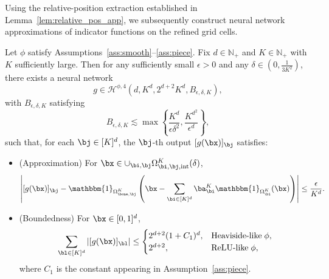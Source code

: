 \documentclass[11pt]{article}
\begin{document}
Using the relative-position extraction established in Lemma~\ref{lem:relative_pos_app},  we subsequently construct neural network approximations of indicator functions on the refined grid cells.
\begin{lemma}
    Let $\phi$ satisfy Assumptions~\ref{ass:smooth}--\ref{ass:piece}. Fix $d\in\mathbb{N}_{+}$ and $K\in\mathbb{N}_{+}$ with $K$ sufficiently large.
    Then for any sufficiently small $\epsilon>0$ and any $\delta \in (0, \frac{1}{3K^2})$, there exists a neural network   
    \begin{equation*}
        g \in \mathcal{H}^{\phi,4} \left(d, K^d,  2^{d+2} K^d, B_{\epsilon, \delta, K} \right),
    \end{equation*}
    with $B_{\epsilon,\delta,K}$ satisfying
    \begin{equation}
        B_{\epsilon,\delta, K} \lesssim \max \left\{ \frac{K^d}{\epsilon \delta^2}, \frac{K^{d^2}}{\epsilon^d} \right\},
        \label{eq:norm_indicator_relative_pos}
    \end{equation}
    such that, for each $\bj\in[K]^d$, the $\bj$-th output $[g(\bx)]_{\bj}$ satisfies:
    \begin{itemize}
        \item (Approximation) For $\bx \in \cup_{\bi, \bj} \Omega_{\bi, \bj, \mathrm{int}}^{K}(\delta)$, 
        \begin{equation*}
            \left|  [g(\bx)]_{\bj} - \mathbbm{1}_{\Omega_{\bone, \bj}^{K}}  \left(\bx - \sum_{\bi \in [K]^d} \ba_{\bi}^K  \mathbbm{1}_{\Omega_{\bi}^K} (\bx)\right) \right| \leq \frac{\epsilon}{K^d}.
        \end{equation*}
        \item (Boundedness) For $\bx \in [0,1]^d$, 
        \begin{equation*}
            \sum_{\bl \in [K]^d} \left| [g(\bx)]_{\bl} \right|\leq \begin{cases}
                2^{d+2} (1+ C_1)^d, &   \textrm{Heaviside-like} \; \phi ,\\
                2^{d+2}, &  \textrm{ReLU-like} \; \phi,
            \end{cases}   
        \end{equation*}
        where $C_1$ is the constant appearing in Assumption~\ref{ass:piece}.
    \end{itemize}
    \label{lem:relative_pos_indicator_app}
\end{lemma}
\end{document}
